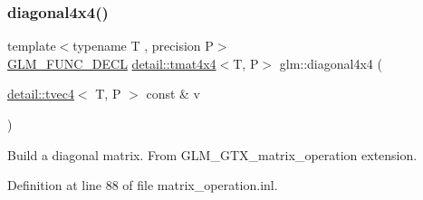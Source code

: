 \subsubsection{\texorpdfstring{diagonal4x4()}{diagonal4x4()}}
{\footnotesize\ttfamily template$<$typename T , precision P$>$ \\
\hyperlink{setup_8hpp_ab2d052de21a70539923e9bcbf6e83a51}{G\+L\+M\+\_\+\+F\+U\+N\+C\+\_\+\+D\+E\+CL} \hyperlink{structglm_1_1detail_1_1tmat4x4}{detail\+::tmat4x4}$<$T, P$>$ glm\+::diagonal4x4 (\begin{DoxyParamCaption}\item[{\hyperlink{structglm_1_1detail_1_1tvec4}{detail\+::tvec4}$<$ T, P $>$ const \&}]{v }\end{DoxyParamCaption})}

Build a diagonal matrix. From G\+L\+M\+\_\+\+G\+T\+X\+\_\+matrix\+\_\+operation extension. 

Definition at line 88 of file matrix\+\_\+operation.\+inl.

